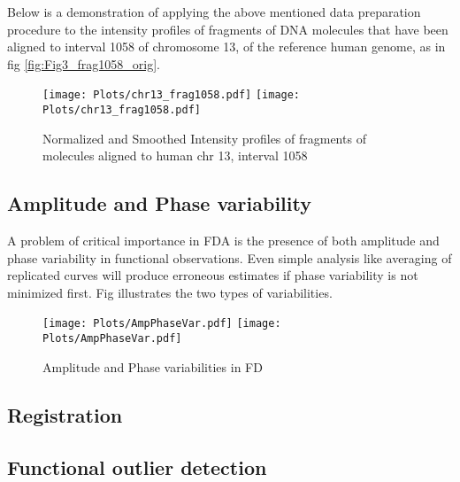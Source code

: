 Below is a demonstration of applying the above mentioned data preparation procedure to the intensity profiles of fragments of DNA molecules that have been aligned to interval 1058 of chromosome 13, of the reference human genome, as in fig \ref{fig:Fig3_frag1058_orig}.
\begin{figure}[H]
\begin{center}
\texttt{[image: Plots/chr13\_frag1058.pdf]}
\texttt{[image: Plots/chr13\_frag1058.pdf]}
\end{center}
\caption{Normalized and Smoothed Intensity profiles of fragments of molecules aligned to human chr 13, interval 1058}
\label{fig:Fig3_frag1058_norm}
\end{figure}


\subsection{Amplitude and Phase variability}
A problem of critical importance in FDA is the presence of both amplitude and phase variability in functional observations. Even simple analysis like averaging of replicated curves will produce erroneous estimates if phase variability is not minimized first. Fig \cite{fig:Fig3_AmpPhase} illustrates the two types of variabilities. 
\begin{figure}[H]
\begin{center}
\texttt{[image: Plots/AmpPhaseVar.pdf]}
\texttt{[image: Plots/AmpPhaseVar.pdf]}
\end{center}
\caption{Amplitude and Phase variabilities in FD}
\label{fig:Fig3_AmpPhase}
\end{figure}


\subsection{Registration}

\subsection{Functional outlier detection}


